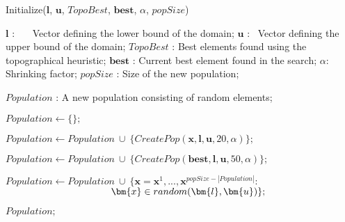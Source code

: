 \begin{algorithm*}
\caption{Initialize($\bm{l}$, $\bm{u}$, $TopoBest$, $\bm{best}$, $\alpha$, $popSize$)}
\label{alg:Initialize}
\begin{algorithmic}[1]


\INPUT{}
\Statex $\bm{l}$ : \ \, \, Vector defining the lower bound of the domain;
\Statex $\bm{u}$ : \quad \  Vector defining the upper bound of the domain;
\Statex $TopoBest$ : Best elements found using the topographical heuristic;
\Statex $\bm{best}$ : Current best element found in the search;
\Statex $\alpha$: \ \, \,   Shrinking factor;
\Statex $popSize$ : Size of the new population;
\Statex

\OUTPUT{}
\Statex $Population$ : A new population consisting of random elements;
\Statex
\Statex

\State $Population \gets \{\};$
\Statex



\State $Population \gets Population \ \cup \ \{CreatePop(\bm{x}, \bm{l}, \bm{u}, 20, \alpha) \};$
\EndFor
\Statex

\State $Population \gets Population \ \cup \ \{CreatePop(\bm{best}, \bm{l}, \bm{u}, 50, \alpha) \};$

\EndIf
\Statex

\State $Population \gets Population \ \cup \ \{\bm{x} = \bm{x}^1, ..., \bm{x}^{popSize-|Population|} :$
\StatexIndent[2] $\hspace{3.8cm}  \bm{x} \in random(\bm{l}, \bm{u}) \};$
\Statex

\State \Return $Population;$



\end{algorithmic}
\end{algorithm*}